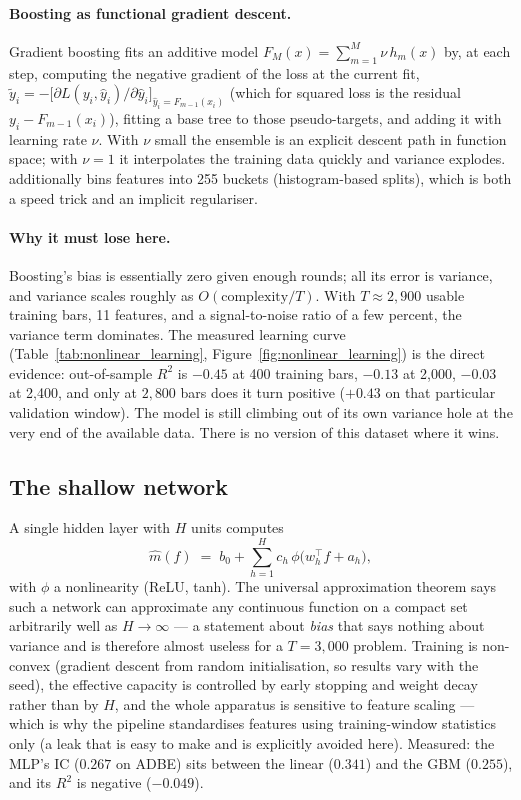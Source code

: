 \paragraph{Boosting as functional gradient descent.} Gradient boosting fits an additive
model $F_M(x)=\sum_{m=1}^M \nu\,h_m(x)$ by, at each step, computing the negative gradient
of the loss at the current fit,
$\tilde y_i = -\bigl[\partial L(y_i, \hat y_i)/\partial \hat y_i\bigr]_{\hat y_i=F_{m-1}(x_i)}$
(which for squared loss is the residual $y_i-F_{m-1}(x_i)$), fitting a base tree to those
pseudo-targets, and adding it with learning rate $\nu$. With $\nu$ small the ensemble is
an explicit descent path in function space; with $\nu=1$ it interpolates the training
data quickly and variance explodes.  additionally
bins features into 255 buckets (histogram-based splits), which is both a speed trick and
an implicit regulariser.

\paragraph{Why it must lose here.} Boosting's bias is essentially zero given enough
rounds; all its error is variance, and variance scales roughly as
$O(\text{complexity}/T)$. With $T\approx2{,}900$ usable training bars, 11 features, and a
signal-to-noise ratio of a few percent, the variance term dominates. The measured
learning curve (Table~\ref{tab:nonlinear_learning},
Figure~\ref{fig:nonlinear_learning}) is the direct evidence: out-of-sample $R^2$ is
$-0.45$ at 400 training bars, $-0.13$ at 2{,}000, $-0.03$ at 2{,}400, and only at
$2{,}800$ bars does it turn positive ($+0.43$ on that particular validation window). The
model is still climbing out of its own variance hole at the very end of the available
data. There is no version of this dataset where it wins.

\subsection{The shallow network}
\label{sec:nonlinear:mlp}

A single hidden layer with $H$ units computes
\begin{equation}
  \hat m(f) \;=\; b_0 + \sum_{h=1}^{H} c_h\,\phi\bigl(w_h^{\top}f + a_h\bigr),
  \label{eq:mlp}
\end{equation}
with $\phi$ a nonlinearity (ReLU, tanh). The universal approximation theorem says such a
network can approximate any continuous function on a compact set arbitrarily well as
$H\to\infty$ --- a statement about \emph{bias} that says nothing about variance and is
therefore almost useless for a $T=3{,}000$ problem. Training is non-convex
(gradient descent from random initialisation, so results vary with the seed), the
effective capacity is controlled by early stopping and weight decay rather than by $H$,
and the whole apparatus is sensitive to feature scaling --- which is why the pipeline
standardises features using training-window statistics only (a leak that is easy to make
and is explicitly avoided here). Measured: the MLP's IC ($0.267$ on ADBE) sits between
the linear ($0.341$) and the GBM ($0.255$), and its $R^2$ is negative ($-0.049$).

